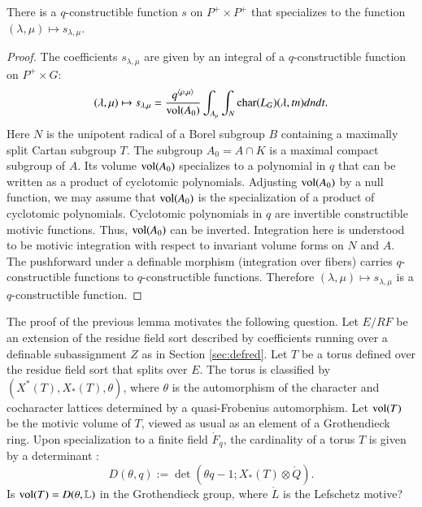 \begin{lemma}\label{lemma:satake} 
  There is a $q$-constructible function $s$ on $P^+\times P^+$ that
  specializes to the function $(\lambda,\mu)\mapsto s_{\lambda,\mu}$.
\end{lemma}

\begin{proof} 
  The coefficients $s_{\lambda,\mu}$ are given by an integral of a $q$-constructible
  function on $P^+\times G$:
\begin{equation}\label{eqn:s}
(\lambda,\mu)\mapsto s_{\lambda,\mu}
=\frac{q^{\langle\rho,\mu\rangle}}{{\operatorname{vol}}(A_0)} 
\int_{A_\mu} \int_N {\operatorname{char}}(L_G)(\lambda,t n) dn dt.
\end{equation}
Here $N$ is the unipotent radical of a Borel subgroup $B$ containing a
maximally split Cartan subgroup $T$.  The subgroup $A_0 = A\cap K$ is
a maximal compact subgroup of $A$.  Its volume ${\operatorname{vol}}(A_0)$
specializes to a polynomial in $q$ that can be written as a product of
cyclotomic polynomials.  Adjusting ${\operatorname{vol}}(A_0)$ by a null function,
we may assume that ${\operatorname{vol}}(A_0)$ is the specialization of a product
of cyclotomic polynomials.  Cyclotomic polynomials in $q$ are invertible
constructible motivic functions.  Thus, ${\operatorname{vol}}(A_0)$ can be
inverted.  Integration here is understood to be motivic integration
with respect to invariant volume forms on $N$ and $A$.  The
pushforward under a definable morphism (integration over fibers)
carries $q$-constructible functions to $q$-constructible functions.
Therefore $(\lambda,\mu)\mapsto s_{\lambda,\mu}$ is a
$q$-constructible function.
\end{proof}


\begin{remark} The proof of the previous lemma motivates the following
  question.  Let $E/RF$ be an extension of the residue field sort
  described by coefficients running over a definable subassignment
  $Z$ as in Section \ref{sec:defred}.  Let $T$ be a torus defined over
  the residue field sort that splits over $E$.  The torus is
  classified by $(X^*(T),X_*(T),\theta)$, where $\theta$ is the
  automorphism of the character and cocharacter lattices determined by
  a quasi-Frobenius automorphism.  Let ${\operatorname{vol}}(T)$ be the motivic
  volume of $T$, viewed as usual as an element of a Grothendieck ring.
  Upon specialization to a finite field $\ring{F}_q$, the cardinality of a torus $T$ is
  given by a determinant \cite[Prop.3.3.7]{carter1985finite}:
\[
D(\theta,q):=\det(\theta q-1; X_*(T)\otimes\ring{Q}).
\]
Is ${\operatorname{vol}}(T) = D(\theta,\mathbb{L})$ in the
Grothendieck group, where $\ring{L}$ is the Lefschetz motive?
\end{remark}


